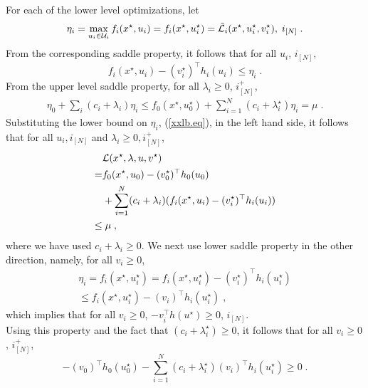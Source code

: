 \documentclass[journal,twoside,web]{ieeecolor}
\begin{document}
\noindent
For each of the lower level optimizations, let  
\begin{align*}
\eta_i=\max_{u_i\in {\cal U}_i}f_i(x^\star,u_i)=f_i(x^\star,u_i^\star)=
\tilde{\cal L}_i(x^\star,u_i^\star,v_i^\star),\; i_{[N]}\;.
\end{align*}
From the corresponding saddle property, it follows that for all $u_i$, $i_{[N]}$,
\begin{equation}\label{xxlb.eq}
f_i(x^\star,u_i)-(v_i^\star)^\top h_i(u_i)\leq \eta_i\;.
\end{equation}
From the upper level saddle property, for all $\lambda_i\geq 0$, $i^+_{[N]}$,
\begin{align*}
\eta_0+\sum_i(c_i+\lambda_i)\eta_i\leq f_0(x^\star,u_0^\star)+\sum_{i=1}^N(c_i+\lambda_i^\star)\eta_i=\mu\;.
\end{align*}
Substituting the lower bound on $\eta_i$, (\ref{xxlb.eq}), in the left hand side, it follows that for all $u_i, i_{[N]}$ and $\lambda_i\geq 0, i^+_{[N]}$,
\begin{align*}
&{\cal L}(x^\star,\lambda,u,v^\star)\\
= &f_0(x^\star,u_0)-(v_0^\star)^\top h_0(u_0)\\
& +\sum_{i=1}^
N(c_i+\lambda_i)(f_i(x^\star,u_i)-(v_i^\star)^\top h_i(u_i))\\
\leq &\;\mu\;,
\end{align*}
where we have used $c_i+\lambda_i\geq 0$. We next use lower saddle property in the other direction, namely, for all $v_i\geq 0$,
\begin{align*}
\eta_i=f_i(x^\star,u_i^\star)=f_i(x^\star,u_i^\star)-(v_i^\star)^\top h_i(u_i^\star)\\
\leq f_i(x^\star,u_i^\star)-(v_i)^\top h_i(u_i^\star)\;,
\end{align*}
which implies that for all $v_i\geq 0$, $-v_i^\top h(u^\star)\geq 0$, $i_{[N]}$.\\
Using this property and the fact that $(c_i+\lambda_i^\star)\geq 0$, it follows that for all $v_i\geq 0$, $i^+_{[N]}$,
\begin{equation}\label{xxub.eq}
-(v_0)^\top h_0(u_0^\star)-\sum_{i=1}^N(c_i+\lambda_i^\star)(v_i)^\top h_i(u_i^\star)\geq 0\;.
\end{equation}
\end{document}
